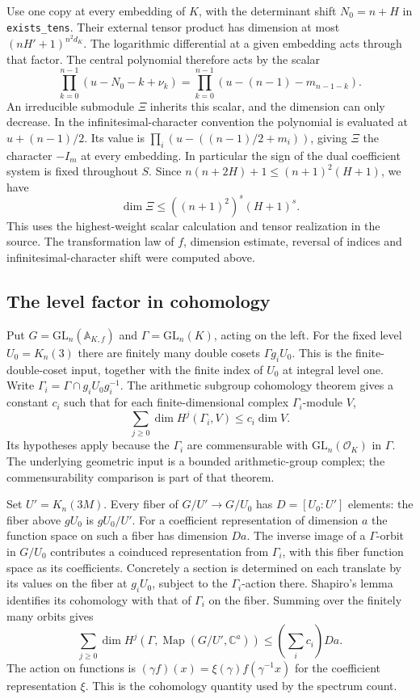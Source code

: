 Use one copy at every embedding of $K$, with the determinant shift
$N_0=n+H$ in \texttt{exists\_tens}. Their external tensor product
has dimension at most $(nH'+1)^{n^2d_K}$. The logarithmic differential
at a given embedding acts through that factor. The central polynomial
therefore acts by the scalar
\[
 \prod_{k=0}^{n-1}(u-N_0-k+\nu_k)
       =\prod_{k=0}^{n-1}(u-(n-1)-m_{n-1-k}).
\]
An irreducible submodule $\Xi$ inherits this scalar, and the dimension
can only decrease. In the infinitesimal-character convention the
polynomial is evaluated at $u+(n-1)/2$. Its value is
$\prod_i(u-((n-1)/2+m_i))$, giving $\Xi$ the character $-I_m$
at every embedding. In particular the sign of the dual coefficient
system is fixed throughout $S$. Since
$n(n+2H)+1\le(n+1)^2(H+1)$, we have
\[
                 \dim\Xi\le((n+1)^2)^s (H+1)^s .
\]
This uses the highest-weight scalar calculation and tensor realization
in the source. The transformation law of $f$, dimension estimate,
reversal of indices and infinitesimal-character shift were computed
above.

\subsection{The level factor in cohomology}

Put $G=\mathrm{GL}_n(\mathbb A_{K,f})$ and
$\Gamma=\mathrm{GL}_n(K)$, acting on the left. For the fixed level
$U_0=K_n(3)$ there are finitely many double cosets
$\Gamma g_i U_0$. This is the finite-double-coset input, together
with the finite index of $U_0$ at integral level one. Write
$\Gamma_i=\Gamma\cap g_iU_0g_i^{-1}$. The arithmetic subgroup
cohomology theorem  gives a constant $c_i$
such that for each finite-dimensional complex $\Gamma_i$-module $V$,
\[
          \sum_{j\ge0}\dim H^j(\Gamma_i,V)\le c_i\dim V .
\]
Its hypotheses apply because the $\Gamma_i$ are commensurable with
$\mathrm{GL}_n(\mathcal O_K)$ in $\Gamma$. The underlying geometric
input is a bounded arithmetic-group complex; the commensurability
comparison is part of that theorem.

Set $U'=K_n(3M)$. Every fiber of $G/U'\to G/U_0$ has
$D=[U_0:U']$ elements: the fiber above $gU_0$ is $gU_0/U'$.
For a coefficient representation of dimension $a$ the function
space on such a fiber has dimension $Da$. The inverse image of a
$\Gamma$-orbit in $G/U_0$ contributes a coinduced representation
from $\Gamma_i$, with this fiber function space as its coefficients.
Concretely a section is determined on each translate by its values
on the fiber at $g_iU_0$, subject to the $\Gamma_i$-action there.
Shapiro's lemma identifies its cohomology with that of $\Gamma_i$
on the fiber. Summing over the finitely many orbits gives
\[
 \sum_{j\ge0}\dim H^j\!\left(\Gamma,
        \operatorname{Map}(G/U',\mathbb C^a)\right)
                  \le \left(\sum_i c_i\right) Da .
\]
The action on functions is
$(\gamma f)(x)=\xi(\gamma)f(\gamma^{-1}x)$ for the coefficient
representation $\xi$. This is the cohomology quantity
 used by the spectrum count.

